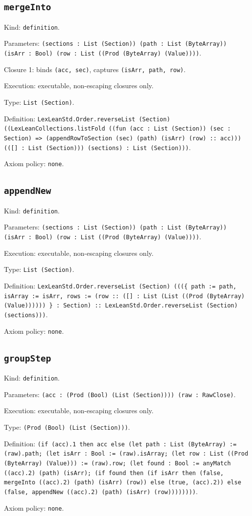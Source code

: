 \documentclass[11pt]{article}
\begin{document}
\subsection*{\texttt{mergeInto}}
\noindent Kind: \texttt{definition}.\par
\noindent Parameters: \texttt{(sections : List (Section)) (path : List (ByteArray)) (isArr : Bool) (row : List ((Prod (ByteArray) (Value))))}.\par
\noindent Closure 1: binds \texttt{(acc, sec)}, captures \texttt{(isArr, path, row)}.\par
\noindent Execution: executable, non-escaping closures only.\par
\noindent Type: \texttt{List (Section)}.\par
\noindent Definition: \texttt{LexLeanStd.Order.reverseList (Section) ((LexLeanCollections.listFold ((fun (acc : List (Section)) (sec : Section) => (appendRowToSection (sec) (path) (isArr) (row) :: acc))) (([] : List (Section))) (sections) : List (Section)))}.\par
\noindent Axiom policy: \texttt{none}.\par
\subsection*{\texttt{appendNew}}
\noindent Kind: \texttt{definition}.\par
\noindent Parameters: \texttt{(sections : List (Section)) (path : List (ByteArray)) (isArr : Bool) (row : List ((Prod (ByteArray) (Value))))}.\par
\noindent Execution: executable, non-escaping closures only.\par
\noindent Type: \texttt{List (Section)}.\par
\noindent Definition: \texttt{LexLeanStd.Order.reverseList (Section) (((\{ path := path, isArray := isArr, rows := (row :: ([] : List (List ((Prod (ByteArray) (Value)))))) \} : Section) :: LexLeanStd.Order.reverseList (Section) (sections)))}.\par
\noindent Axiom policy: \texttt{none}.\par
\subsection*{\texttt{groupStep}}
\noindent Kind: \texttt{definition}.\par
\noindent Parameters: \texttt{(acc : (Prod (Bool) (List (Section)))) (raw : RawClose)}.\par
\noindent Execution: executable, non-escaping closures only.\par
\noindent Type: \texttt{(Prod (Bool) (List (Section)))}.\par
\noindent Definition: \texttt{(if (acc).1 then acc else (let path : List (ByteArray) := (raw).path; (let isArr : Bool := (raw).isArray; (let row : List ((Prod (ByteArray) (Value))) := (raw).row; (let found : Bool := anyMatch ((acc).2) (path) (isArr); (if found then (if isArr then (false, mergeInto ((acc).2) (path) (isArr) (row)) else (true, (acc).2)) else (false, appendNew ((acc).2) (path) (isArr) (row))))))))}.\par
\noindent Axiom policy: \texttt{none}.\par
\end{document}
